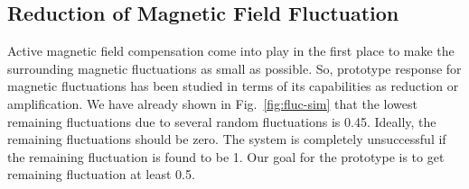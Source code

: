 
\subsection{Reduction of Magnetic Field Fluctuation}

Active magnetic field compensation come into play in the first place to make the surrounding magnetic fluctuations as small as possible. So, prototype response for magnetic fluctuations has been studied in terms of its capabilities as reduction or amplification. We have already shown in Fig.~\ref{fig:fluc-sim} that the lowest remaining fluctuations due to several random fluctuations is 0.45. Ideally, the remaining fluctuations should be zero. The system is completely unsuccessful if the remaining fluctuation is found to be 1. Our goal for the prototype is to get remaining fluctuation at least 0.5.


